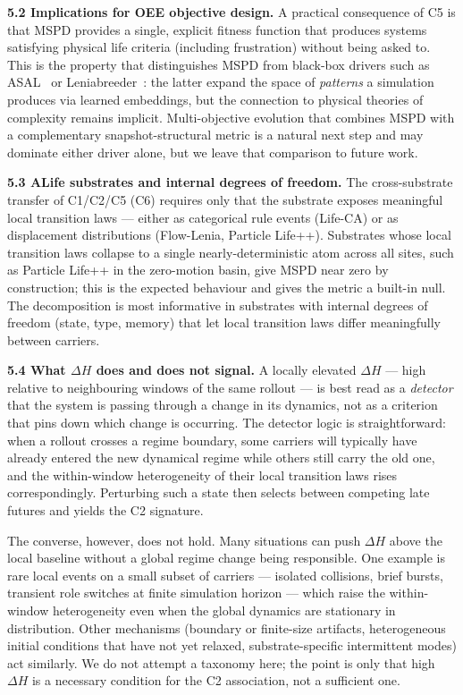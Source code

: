 \documentclass[
  11pt,
]{article}
\begin{document}
\textbf{5.2 Implications for OEE objective design.}
A practical consequence of C5 is that MSPD provides a single, explicit
fitness function that produces systems satisfying physical life
criteria (including frustration) without being asked to. This is the property
that distinguishes MSPD from black-box drivers such as
ASAL~\cite{kumar2024automating} or
Leniabreeder~\cite{faldor2024leniabreeder}: the latter expand the
space of \emph{patterns} a simulation produces via learned
embeddings, but the connection to physical theories of complexity
remains implicit. Multi-objective evolution that combines MSPD with a
complementary snapshot-structural metric is a natural next step and
may dominate either driver alone, but we leave that comparison to
future work.

\textbf{5.3 ALife substrates and internal degrees of freedom.}
The cross-substrate transfer of C1/C2/C5 (C6) requires only that the
substrate exposes meaningful local transition laws --- either as
categorical rule events (Life-CA) or as displacement distributions
(Flow-Lenia, Particle Life++). Substrates whose local transition
laws collapse to a single nearly-deterministic atom across all
sites, such as Particle Life++ in the zero-motion basin, give MSPD
near zero by construction; this is the expected behaviour and gives
the metric a built-in null. The decomposition is most informative
in substrates with internal degrees of freedom (state, type,
memory) that let local transition laws differ meaningfully between
carriers.

\textbf{5.4 What $\Delta H$ does and does not signal.}
A locally elevated $\Delta H$ --- high relative to neighbouring
windows of the same rollout --- is best read as a
\emph{detector} that the system is passing through a change
in its dynamics, not as a criterion that pins down which
change is occurring. The detector logic is straightforward:
when a rollout crosses a regime boundary, some carriers will
typically have already entered the new dynamical regime while
others still carry the old one, and the within-window
heterogeneity of their local transition laws rises
correspondingly. Perturbing such a state then selects between
competing late futures and yields the C2 signature.

The converse, however, does not hold. Many situations can
push $\Delta H$ above the local baseline without a global
regime change being responsible. One example is rare local
events on a small subset of carriers --- isolated collisions,
brief bursts, transient role switches at finite simulation
horizon --- which raise the within-window heterogeneity even
when the global dynamics are stationary in distribution.
Other mechanisms (boundary or finite-size artifacts,
heterogeneous initial conditions that have not yet relaxed,
substrate-specific intermittent modes) act similarly. We do
not attempt a taxonomy here; the point is only that high
$\Delta H$ is a necessary condition for the C2 association,
not a sufficient one.
\end{document}
